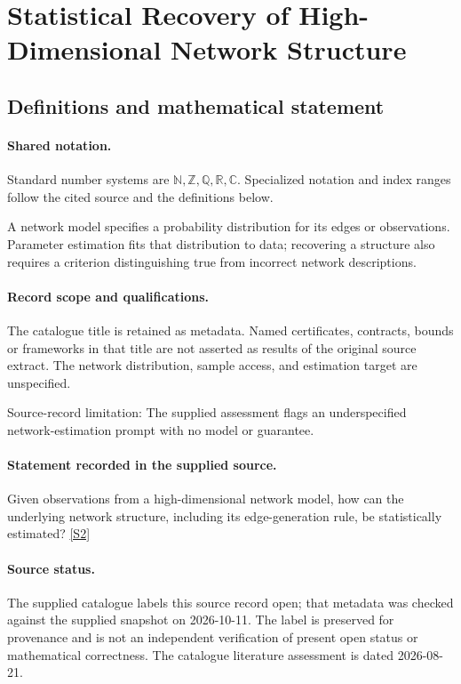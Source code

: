 \documentclass[11pt]{article}
\newcommand{\sref}[2]{\hyperlink{source:#1:#2}{[S#2]}}
\begin{document}
\section{Statistical Recovery of High-Dimensional Network Structure}\label{statement}

\subsection{Definitions and mathematical statement}

\paragraph{Shared notation.}Standard number systems are $\mathbb N,\mathbb Z,\mathbb Q,\mathbb R,\mathbb C$. Specialized notation and index ranges follow the cited source and the definitions below.


A network model specifies a probability distribution for its edges or observations. Parameter estimation fits that distribution to data; recovering a structure also requires a criterion distinguishing true from incorrect network descriptions.
\paragraph{Record scope and qualifications.}
The catalogue title is retained as metadata. Named certificates, contracts, bounds or frameworks in that title are not asserted as results of the original source extract.
The network distribution, sample access, and estimation target are unspecified.

Source-record limitation: The supplied assessment flags an underspecified network-estimation prompt with no model or guarantee.
\paragraph{Statement recorded in the supplied source.}
Given observations from a high-dimensional network model, how can the underlying network structure, including its edge-generation rule, be statistically estimated? \sref{statement}{2}
\paragraph{Source status.}
The supplied catalogue labels this source record open; that metadata was checked against the supplied snapshot on 2026-10-11. The label is preserved for provenance and is not an independent verification of present open status or mathematical correctness. The catalogue literature assessment is dated 2026-08-21.
\end{document}
